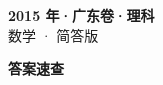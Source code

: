 \documentclass[zihao=-4, a4paper]{ctexart}
\begin{document}
\begin{center}
  {\Large\bfseries 2015 年·广东卷·理科}\\[4pt]
  {\large 数学 · 简答版}
\end{center}
\medskip
{}

\clearpage
{}
\begin{center}{\Large\bfseries 答案速查}\end{center}
\medskip

\end{document}
